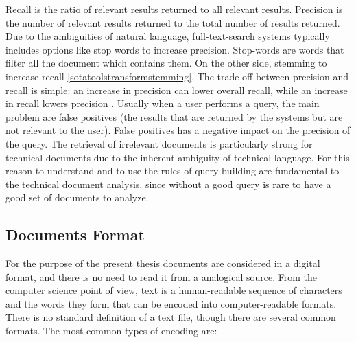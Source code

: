 \documentclass[]{book}
\begin{document}
Recall is the ratio of relevant results returned to all relevant
results. Precision is the number of relevant results returned to the
total number of results returned. Due to the ambiguities of natural
language, full-text-search systems typically includes options like stop
words to increase precision. Stop-words are words that filter all the
document which contains them. On the other side, stemming to increase
recall \ref{sotatoolstransformstemming}. The trade-off between precision
and recall is simple: an increase in precision can lower overall recall,
while an increase in recall lowers precision \citep{yuwono1996search}.
Usually when a user performs a query, the main problem are false
positives (the results that are returned by the systems but are not
relevant to the user). False positives has a negative impact on the
precision of the query. The retrieval of irrelevant documents is
particularly strong for technical documents due to the inherent
ambiguity of technical language. For this reason to understand and to
use the rules of query building are fundamental to the technical
document analysis, since without a good query is rare to have a good set
of documents to analyze.

\subsection{Documents Format}\label{sotatoolsimportformat}

For the purpose of the present thesis documents are considered in a
digital format, and there is no need to read it from a analogical
source. From the computer science point of view, text is a
human-readable sequence of characters and the words they form that can
be encoded into computer-readable formats. There is no standard
definition of a text file, though there are several common formats. The
most common types of encoding are:
\end{document}

